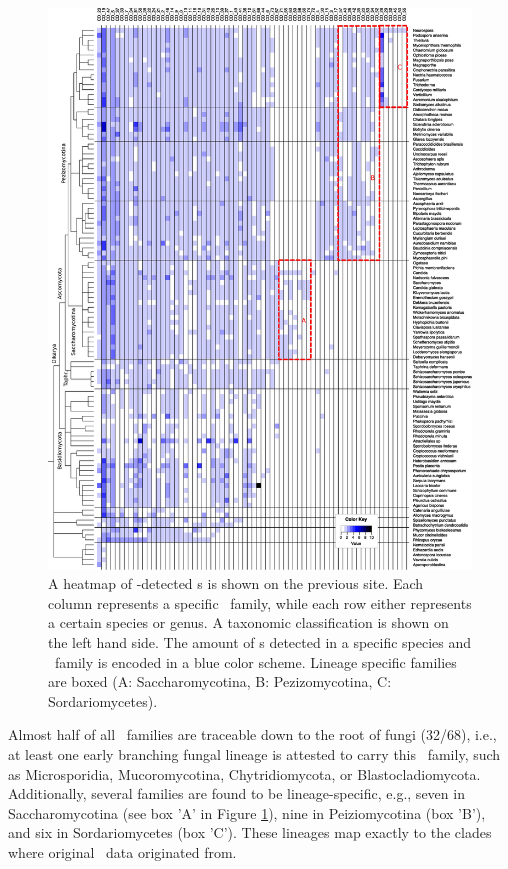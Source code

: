 \begin{figure}
  \centering
  \includegraphics[width=1.05\textwidth]{pics/CD_snoRNAs_collapsed.eps}
  \caption{A heatmap of
    \snostrip-detected \cd s is shown on the previous site. Each column represents a specific \sno\
    family, while each row either represents a certain species or
    genus. A taxonomic classification is shown on the left hand side. The amount of
    \sno s detected in a specific species and \sno\ family is encoded in a
    blue color scheme. Lineage specific families are boxed (A:
    Saccharomycotina, B: Pezizomycotina, C: Sordariomycetes). %
  }
  \label{fig:heatmap_CD_snoRNAs} 
\end{figure}



Almost half of all \cd\
families are traceable down to the root of fungi (32/68), i.e., at least one early
branching fungal lineage is attested to carry this \sno\
family, such as Microsporidia, Mucoromycotina, Chytridiomycota, or
Blastocladiomycota. Additionally, several families are found to be
lineage-specific, e.g., seven in Saccharomycotina (see box 'A' in
Figure \ref{fig:heatmap_CD_snoRNAs}), nine in Peiziomycotina (box
'B'), and six in Sordariomycetes (box 'C'). These lineages map exactly to the
clades where original \sno\ data originated from.

